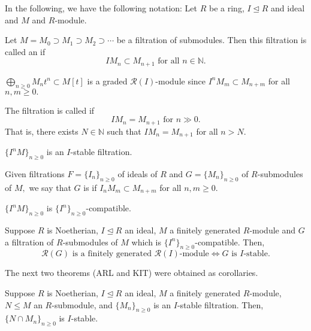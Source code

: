 \documentclass[12pt]{article}	%
\begin{document}
In the following, we have the following notation: Let $R$ be a ring, $I \unlhd R$ and ideal and $M$ and $R$-module.

\begin{defn}%
	Let $M = M_0 \supset M_1 \supset M_2 \supset \cdots$ be a filtration of submodules. Then this filtration is called an  if 
	\begin{equation*} 
		IM_n \subset M_{n + 1} \text{ for all }n \in \mathbb{N}.
	\end{equation*}

	$\bigoplus_{n \ge 0}M_nt^n \subset M[t]$ is a graded $\mathcal{R}(I)$-module since $I^nM_m \subset M_{n + m}$ for all $n, m \ge 0.$

	The filtration is called  if 
	\begin{equation*} 
		IM_n = M_{n + 1} \text{ for }n \gg 0.
	\end{equation*}
	That is, there exists $N \in \mathbb{N}$ such that $IM_n = M_{n + 1}$ for all $n > N.$
\end{defn}
\begin{ex}
	$\{I^nM\}_{n \ge 0}$ is an $I$-stable filtration.
\end{ex}

\begin{defn}%
	Given filtrations $F = \{I_n\}_{n \ge 0}$ of ideals of $R$ and $G = \{M_n\}_{n \ge 0}$ of $R$-submodules of $M,$ we say that $G$ is  if $I_nM_m \subset M_{n + m}$ for all $n, m \ge 0.$
\end{defn}
\begin{ex}
	$\{I^nM\}_{n \ge 0}$ is $\{I^n\}_{n \ge 0}$-compatible.
\end{ex}

\begin{thm}
	Suppose $R$ is Noetherian, $I \unlhd R$ an ideal, $M$ a finitely generated $R$-module and $G$ a filtration of $R$-submodules of $M$ which is $\{I^n\}_{n \ge 0}$-compatible. Then,
	\begin{equation*} 
		\mathcal{R}(G) \text{ is a finitely generated }\mathcal{R}(I)\text{-module} \Leftrightarrow G \text{ is } I \text{-stable}.
	\end{equation*}
\end{thm}

The next two theorems (ARL and KIT) were obtained as corollaries.

\begin{thm}
	Suppose $R$ is Noetherian, $I \unlhd R$ an ideal, $M$ a finitely generated $R$-module, $N \le M$ an $R$-submodule, and $\{M_n\}_{n \ge 0}$ is an $I$-stable filtration. Then, $\{N \cap M_n\}_{n \ge 0}$ is $I$-stable.
\end{thm}
\end{document}
